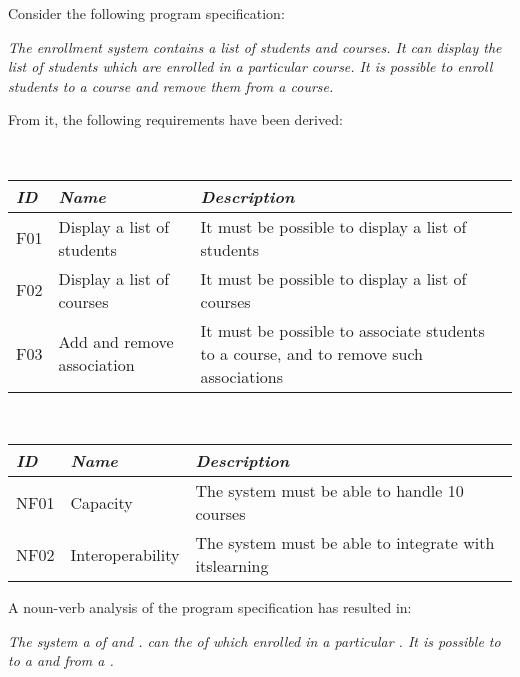 Consider the following program specification:

\begin{center}
  \textsl{The enrollment system contains a list of students and courses. It can display the list of students which are enrolled in a particular course. It is possible to enroll students to a course and remove them from a course.}
\end{center}

\begin{minipage}{\textwidth}
From it, the following requirements have been derived:

\begin{itemize}
   \\
    \begin{tabular}{|p{8mm}|p{4cm}|p{6cm}|}
      \hline
      \emph{ID} & \emph{Name} & \emph{Description} \\
      \hline
      F01 & Display a list of students & It must be possible to display a list of students \\
      \hline
      F02 & Display a list of courses & It must be possible to display a list of courses \\
      \hline
      F03 & Add and remove association & It must be possible to associate students to a course, and to remove such associations \\
      \hline
    \end{tabular}
   \\
    \begin{tabular}{|p{8mm}|p{4cm}|p{6cm}|}
      \hline
      \emph{ID} & \emph{Name} & \emph{Description} \\
      \hline
      NF01 & Capacity & The system must be able to handle 10 courses \\
      \hline
      NF02 & Interoperability & The system must be able to integrate with itslearning \\
      \hline
    \end{tabular}
\end{itemize}
\end{minipage}

\begin{minipage}{\textwidth}
A noun-verb analysis of the program specification has resulted in:

\begin{center}
  \textsl{The  system  a  of  and .  can  the  of  which  enrolled in a particular . It is possible to   to a  and   from a .}
\end{center}
\end{minipage}

